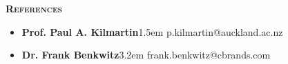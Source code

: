 \documentclass[11pt, a4paper, twoside]{article}
\begin{document}
\vspace{6ex}
\begin{minipage}[t]{0.15\textwidth}
\textsc{\textbf{\Large References}}
  \end{minipage}\hfill
  \begin{minipage}[t]{0.8\textwidth}
  \begin{itemize}[leftmargin=*]
      \setlength\itemsep{-0.2ex}
      \item {\large \textbf{Prof. Paul A. Kilmartin}}\kern1.5em p.kilmartin@auckland.ac.nz
      \item {\large \textbf{Dr. Frank Benkwitz}}\kern3.2em frank.benkwitz@cbrands.com
  \end{itemize}
\end{minipage}\par
\end{document}
